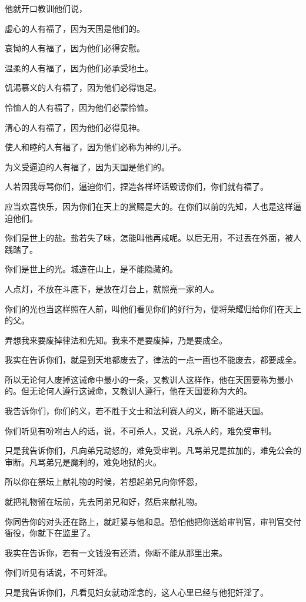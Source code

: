 \documentclass[12pt,oneside]{book}
\begin{document}
他就开口教训他们说，

虚心的人有福了，因为天国是他们的。

哀恸的人有福了，因为他们必得安慰。

温柔的人有福了，因为他们必承受地土。

饥渴慕义的人有福了，因为他们必得饱足。

怜恤人的人有福了，因为他们必蒙怜恤。

清心的人有福了，因为他们必得见神。

使人和睦的人有福了，因为他们必称为神的儿子。

为义受逼迫的人有福了，因为天国是他们的。

人若因我辱骂你们，逼迫你们，捏造各样坏话毁谤你们，你们就有福了。

应当欢喜快乐，因为你们在天上的赏赐是大的。在你们以前的先知，人也是这样逼迫他们。

你们是世上的盐。盐若失了味，怎能叫他再咸呢。以后无用，不过丢在外面，被人践踏了。

你们是世上的光。城造在山上，是不能隐藏的。

人点灯，不放在斗底下，是放在灯台上，就照亮一家的人。

你们的光也当这样照在人前，叫他们看见你们的好行为，便将荣耀归给你们在天上的父。

弄想我来要废掉律法和先知。我来不是要废掉，乃是要成全。

我实在告诉你们，就是到天地都废去了，律法的一点一画也不能废去，都要成全。

所以无论何人废掉这诫命中最小的一条，又教训人这样作，他在天国要称为最小的。但无论何人遵行这诫命，又教训人遵行，他在天国要称为大的。

我告诉你们，你们的义，若不胜于文士和法利赛人的义，断不能进天国。

你们听见有吩咐古人的话，说，不可杀人，又说，凡杀人的，难免受审判。

只是我告诉你们，凡向弟兄动怒的，难免受审判。凡骂弟兄是拉加的，难免公会的审断。凡骂弟兄是魔利的，难免地狱的火。

所以你在祭坛上献礼物的时候，若想起弟兄向你怀怨，

就把礼物留在坛前，先去同弟兄和好，然后来献礼物。

你同告你的对头还在路上，就赶紧与他和息。恐怕他把你送给审判官，审判官交付衙役，你就下在监里了。

我实在告诉你，若有一文钱没有还清，你断不能从那里出来。

你们听见有话说，不可奸淫。

只是我告诉你们，凡看见妇女就动淫念的，这人心里已经与他犯奸淫了。
\end{document}
